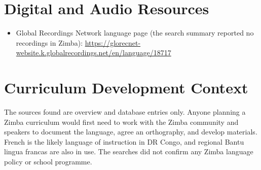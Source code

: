 \documentclass[12pt]{article}
\begin{document}
\section{Digital and Audio Resources}
\begin{itemize}
\item Global Recordings Network language page (the search summary reported no recordings in Zimba): \url{https://glorecnet-website.k.globalrecordings.net/en/language/18717}
\end{itemize}

\section{Curriculum Development Context}
The sources found are overview and database entries only. Anyone planning a Zimba curriculum would first need to work with the Zimba community and speakers to document the language, agree an orthography, and develop materials. French is the likely language of instruction in DR Congo, and regional Bantu lingua francas are also in use. The searches did not confirm any Zimba language policy or school programme.
\end{document}

